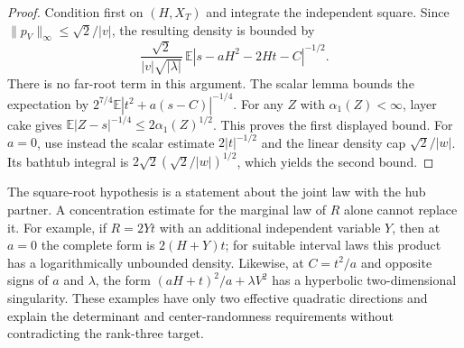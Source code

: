 \begin{proof}
Condition first on $(H,X_T)$ and integrate the independent square.
Since $\|p_V\|_\infty\le\sqrt2/|v|$, the resulting density
is bounded by
\[
 \frac{\sqrt2}{|v|\sqrt{|\lambda|}}\,
 \mathbb E|s-aH^2-2Ht-C|^{-1/2}.
\]
There is no far-root term in this argument.
The scalar lemma bounds the expectation by
$2^{7/4}\mathbb E|t^2+a(s-C)|^{-1/4}$.
For any $Z$ with $\alpha_1(Z)<\infty$, layer cake gives
$\mathbb E|Z-s|^{-1/4}\le2\alpha_1(Z)^{1/2}$.
This proves the first displayed bound.
For $a=0$, use instead the scalar estimate
$2|t|^{-1/2}$ and the linear density cap
$\sqrt2/|w|$.  Its bathtub integral is
$2\sqrt2(\sqrt2/|w|)^{1/2}$, which yields the second bound.
\end{proof}

The square-root hypothesis is a statement about the joint law
with the hub partner.  A concentration estimate for the marginal
law of $R$ alone cannot replace it.  For example, if
$R=2Yt$ with an additional independent variable $Y$, then at
$a=0$ the complete form is $2(H+Y)t$; for suitable interval
laws this product has a logarithmically unbounded density.
Likewise, at $C=t^2/a$ and opposite signs of $a$ and $\lambda$,
the form $(aH+t)^2/a+\lambda V^2$ has a hyperbolic
two-dimensional singularity.  These examples have only two
effective quadratic directions and explain the determinant
and center-randomness requirements without contradicting the
rank-three target.
